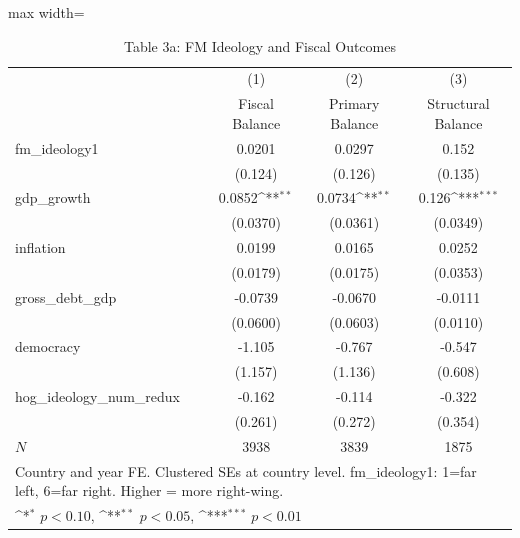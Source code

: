\begin{table}[htbp]\centering
\def\sym#1{\ifmmode^{#1}\else\(^{#1}\)\fi}
\caption{Table 3a: FM Ideology and Fiscal Outcomes}
\begin{adjustbox}{max width=\textwidth}
\small
\begin{tabular}{l*{3}{c}}
\hline\hline
            &\multicolumn{1}{c}{(1)}&\multicolumn{1}{c}{(2)}&\multicolumn{1}{c}{(3)}\\
            &\multicolumn{1}{c}{Fiscal Balance}&\multicolumn{1}{c}{Primary Balance}&\multicolumn{1}{c}{Structural Balance}\\
\hline
fm\_ideology1&      0.0201         &      0.0297         &       0.152         \\
            &     (0.124)         &     (0.126)         &     (0.135)         \\
[1em]
gdp\_growth  &      0.0852\sym{**} &      0.0734\sym{**} &       0.126\sym{***}\\
            &    (0.0370)         &    (0.0361)         &    (0.0349)         \\
[1em]
inflation   &      0.0199         &      0.0165         &      0.0252         \\
            &    (0.0179)         &    (0.0175)         &    (0.0353)         \\
[1em]
gross\_debt\_gdp&     -0.0739         &     -0.0670         &     -0.0111         \\
            &    (0.0600)         &    (0.0603)         &    (0.0110)         \\
[1em]
democracy   &      -1.105         &      -0.767         &      -0.547         \\
            &     (1.157)         &     (1.136)         &     (0.608)         \\
[1em]
hog\_ideology\_num\_redux&      -0.162         &      -0.114         &      -0.322         \\
            &     (0.261)         &     (0.272)         &     (0.354)         \\
\hline
\(N\)       &        3938         &        3839         &        1875         \\
\hline\hline
\multicolumn{4}{l}{\footnotesize Country and year FE. Clustered SEs at country level.  fm\_ideology1: 1=far left, 6=far right. Higher = more right-wing.}\\
\multicolumn{4}{l}{\footnotesize \sym{*} \(p<0.10\), \sym{**} \(p<0.05\), \sym{***} \(p<0.01\)}\\
\end{tabular}
\end{adjustbox}
\end{table}
